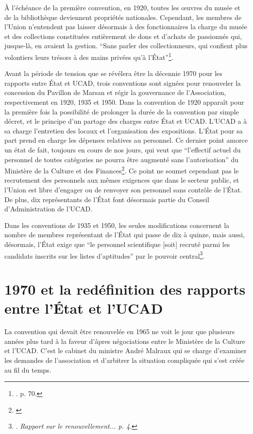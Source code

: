 À l’échéance de la première convention, en 1920, toutes les œuvres du musée et de la bibliothèque deviennent propriétés nationales. Cependant, les membres de l'Union n'entendent pas laisser désormais à des fonctionnaires la charge du musée et des collections constituées entièrement de dons et d'achats de passionnés qui, jusque-là, en avaient la gestion. \enquote{Sans parler des collectionneurs, qui confient plus volontiers leurs trésors à des mains privées qu'à l'État}\footnote{\cite{brunhammer_beau_1992}. p. 70.}. \hfill \break

Avant la période de tension que se révélera être la décennie 1970 pour les rapports entre État et UCAD, trois conventions sont signées pour renouveler la concession du Pavillon de Marsan et régir la gouvernance de l'Association, respectivement en 1920, 1935 et 1950. Dans la convention de 1920 apparaît pour la première fois la possibilité de prolonger la durée de la convention par simple décret, et le principe d'un partage des charges entre État et UCAD. L'UCAD a à sa charge l'entretien des locaux et l'organisation des expositions. L'État pour sa part prend en charge les dépenses relatives au personnel. Ce dernier point amorce un état de fait, toujours en cours de nos jours, qui veut que \enquote{l'effectif actuel du personnel de toutes catégories ne pourra être augmenté sans l'autorisation} du Ministère de la Culture et des Finances\footnote{\cite{noauthor__1970}}. Ce point ne soumet cependant pas le recrutement des personnels aux mêmes exigences que dans le secteur public, et l'Union est libre d'engager ou de renvoyer son personnel sans contrôle de l'État. De plus, dix représentants de l'État font désormais partie du Conseil d'Administration de l'UCAD. 

Dans les conventions de 1935 et 1950, les seules modifications concernent la nombre de membres représentant de l'État qui passe de dix à quinze, mais aussi, désormais, l'État exige que \enquote{le personnel scientifique [soit] recruté parmi les candidats inscrits sur les listes d'aptitudes} par le pouvoir central\footnote{\cite{noauthor__1970}. \textit{Rapport sur le renouvellement... p. 4}.}.

\section{1970 et la redéfinition des rapports entre l'État et l'UCAD}

La convention qui devait être renouvelée en 1965 ne voit le jour que plusieurs années plus tard à la faveur d'âpres négociations entre le Ministère de la Culture et l'UCAD. C'est le cabinet du ministre André Malraux qui se charge d'examiner les demandes de l'association et d'arbitrer la situation compliquée qui s'est créée au fil du temps.

